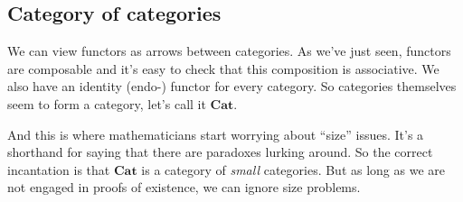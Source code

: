\documentclass[DaoFP]{subfiles}
\begin{document}
\subsection{Category of categories}

We can view functors as arrows between categories. As we've just seen, functors are composable and it's easy to check that this composition is associative. We also have an identity (endo-) functor for every category. So categories themselves seem to form a category, let's call it $\mathbf{Cat}$. 

And this is where mathematicians start worrying about ``size'' issues. It's a shorthand for saying that there are paradoxes lurking around. So the correct incantation is that $\mathbf{Cat}$ is a category of \emph{small} categories. But as long as we are not engaged in proofs of existence, we can ignore size problems.
\end{document}
